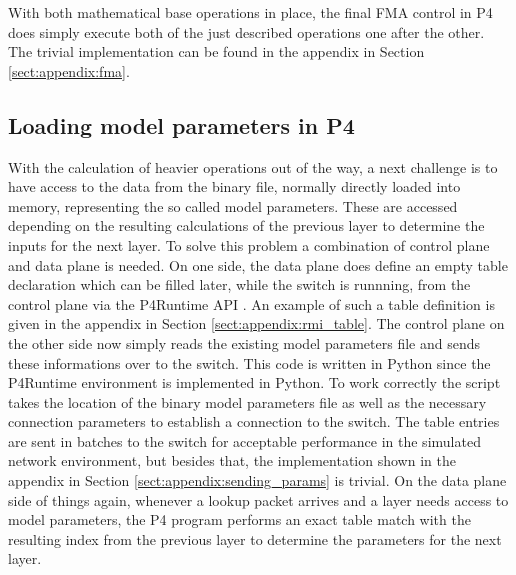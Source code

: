 With both mathematical base operations in place, the final FMA control in P4 does simply execute both of the just described operations one after the other. The trivial implementation can be found in the appendix in Section \ref{sect:appendix:fma}.

\subsection{Loading model parameters in P4}
With the calculation of heavier operations out of the way, a next challenge is to have access to the data from the binary file, normally directly loaded into memory, representing the so called model parameters. These are accessed depending on the resulting calculations of the previous layer to determine the inputs for the next layer. To solve this problem a combination of control plane and data plane is needed. On one side, the data plane does define an empty table declaration which can be filled later, while the switch is runnning, from the control plane via the P4Runtime API \cite{p4runtime-spec}. An example of such a table definition is given in the appendix in Section \ref{sect:appendix:rmi_table}. The control plane on the other side now simply reads the existing model parameters file and sends these informations over to the switch. This code is written in Python since the P4Runtime environment is implemented in Python. To work correctly the script takes the location of the binary model parameters file as well as the necessary connection parameters to establish a connection to the switch. The table entries are sent in batches to the switch for acceptable performance in the simulated network environment, but besides that, the implementation shown in the appendix in Section \ref{sect:appendix:sending_params} is trivial. On the data plane side of things again, whenever a lookup packet arrives and a layer needs access to model parameters, the P4 program performs an exact table match with the resulting index from the previous layer to determine the parameters for the next layer.


